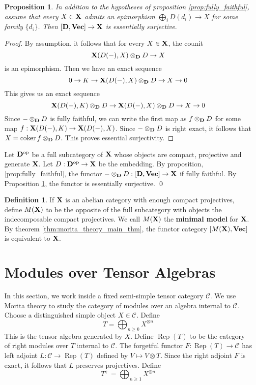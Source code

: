 \documentclass[12pt]{amsart}
\theoremstyle{plain}
\newtheorem{Proposition}[Theorem]{Proposition}
\theoremstyle{definition}
\newtheorem{Definition}[Theorem]{Definition}
\DeclareMathOperator{\Rep}{Rep}
\DeclareMathOperator{\coker}{coker}
\newcommand{\Vect}{{\bf Vec}}
\newcommand{\XX}{{\bf X}}
\newcommand{\DD}{{\bf D}}
\begin{document}
\begin{Proposition} \label{prop:essentially_surjective}
In addition to the hypotheses of proposition \ref{prop:fully_faithful}, assume that every $X \in \XX$ admits an epimorphism $\bigoplus_i D(d_i) \to X$ for some family $\{ d_i\}$. Then $[\DD,\Vect] \to \XX$ is essentially surjective.
\end{Proposition}
\begin{proof}
By assumption, it follows that for every $X \in \XX$, the counit
$$ \XX(D(-),X) \otimes_{\DD} D \to X$$
is an epimorphism. Then we have an exact sequence
$$ 0 \to K \to \XX(D(-),X) \otimes_{\DD} D \to X \to 0$$
This gives us an exact sequence
$$ \XX(D(-),K) \otimes_{\DD} D \to \XX(D(-),X) \otimes_{\DD} D \to X \to 0$$
Since $-\otimes_{\DD} D$ is fully faithful, we can write the first map as $f \otimes_{\DD} D$ for some map $f : \XX(D(-),K) \to \XX(D(-),X)$. Since $- \otimes_{\DD} D$ is right exact, it follows that $X = \coker f \otimes_{\DD} D$. This proves essential surjectivity.
\end{proof}

 Let $\DD^{\rm op}$ be a full subcategory of $\XX$ whose objects are compact, projective and generate $\XX$. Let $D : \DD^{\rm op} \to \XX$ be the embedding. By proposition, \ref{prop:fully_faithful}, the functor $ - \otimes_{\DD} D : [\DD,\Vect] \to \XX$ if fully faithful. By Proposition \ref{prop:essentially_surjective}, the functor is essentially surjective. \qed

\begin{Definition} \label{def:minimal_model}
  If $\XX$ is an abelian category with enough compact projectives, define $M(\XX)$ to be the opposite of the full subcategory with objects the indecomposable compact projectives. We call $M(\XX)$ the {\bf minimal model} for $\XX$. By theorem \ref{thm:morita_theory_main_thm}, the functor category $[M(\XX),\Vect]$ is equivalent to $\XX$.
\end{Definition}


\section{Modules over Tensor Algebras} \label{sec:modules_over_tensor_algebras}

In this section, we work inside a fixed semi-simple tensor category $\mathcal{C}$. We use Morita theory to study the category of modules over an algebra internal to $\mathcal{C}$. Choose a distinguished simple object $X \in \mathcal{C}$. Define
\[
T = \bigoplus_{n \geq 0} X^{\otimes n}
\]
This is the tensor algebra generated by $X$. Define $\Rep(T)$ to be the category of right modules over $T$ internal to $\mathcal{C}$. The forgetful functor $F : \Rep(T) \to \mathcal{C}$ has left adjoint $L : \mathcal{C} \to \Rep(T)$ defined by $V \mapsto V \otimes T$. Since the right adjoint $F$ is exact, it follows that $L$ preserves projectives. Define
\[
T^{+} = \bigoplus_{n \geq 1} X^{\otimes n}
\]
\end{document}
